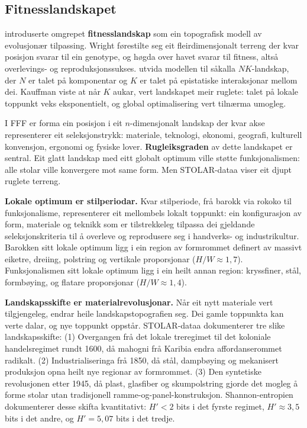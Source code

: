 \documentclass[10pt, a4paper, twocolumn]{article}
\begin{document}
\subsection{Fitnesslandskapet}

\citet{wright1932} introduserte omgrepet \textbf{fitnesslandskap} som ein topografisk modell av evolusjonær tilpassing. Wright førestilte seg eit fleirdi\-men\-sjonalt terreng der kvar posisjon svarar til ein genotype, og høgda over havet svarar til fitness, altså overlevings- og reproduksjonssukses. \citet{kauffman1993} utvida modellen til såkalla $NK$-landskap, der $N$ er talet på komponentar og $K$ er talet på epistatiske interaksjonar mellom dei. Kauffman viste at når $K$ aukar, vert landskapet meir ruglete: talet på lokale toppunkt veks eksponentielt, og global optimalisering vert tilnærma umogleg.

I FFF er forma ein posisjon i eit $n$-dimensjonalt landskap der kvar akse representerer eit seleksjonstrykk: materiale, teknologi, økonomi, geografi, kulturell konvensjon, ergonomi og fysiske lover. \textbf{Rugleiksgraden} av dette landskapet er sentral. Eit glatt landskap med eitt globalt optimum ville støtte funksjonalismen: alle stolar ville konvergere mot same form. Men STOLAR-dataa viser eit djupt ruglete terreng.

\textbf{Lokale optimum er stilperiodar.} Kvar stilperiode, frå barokk via rokoko til funksjonalisme, representerer eit mellombels lokalt toppunkt: ein konfigurasjon av form, materiale og teknikk som er tilstrekkeleg tilpassa dei gjeldande seleksjonskriteria til å overleve og reprodusere seg i handverks- og industrikultur. Barokken sitt lokale optimum ligg i ein region av formrommet definert av massivt eiketre, dreiing, polstring og vertikale proporsjonar ($H/W \approx 1{,}7$). Funksjonalismen sitt lokale optimum ligg i ein heilt annan region: kryssfiner, stål, formbøying, og flatare proporsjonar ($H/W \approx 1{,}4$).

\textbf{Landskapsskifte er materialrevolusjonar.} Når eit nytt materiale vert tilgjengeleg, endrar heile landskapstopografien seg. Dei gamle toppunkta kan verte dalar, og nye toppunkt oppstår. STOLAR-dataa dokumenterer tre slike landskapsskifte: (1) Overgangen frå det lokale treregimet til det koloniale handelsregimet rundt 1600, då mahogni frå Karibia endra affordanserommet radikalt. (2) Industrialiseringa frå 1850, då stål, dampbøying og mekanisert produksjon opna heilt nye regionar av formrommet. (3) Den syntetiske revolusjonen etter 1945, då plast, glasfiber og skumpolstring gjorde det mogleg å forme stolar utan tradisjonell ramme-og-panel-konstruksjon. Shannon-entropien dokumenterer desse skifta kvantitativt: $H' < 2$ bits i det fyrste regimet, $H' \approx 3{,}5$ bits i det andre, og $H' = 5{,}07$ bits i det tredje.
\end{document}

